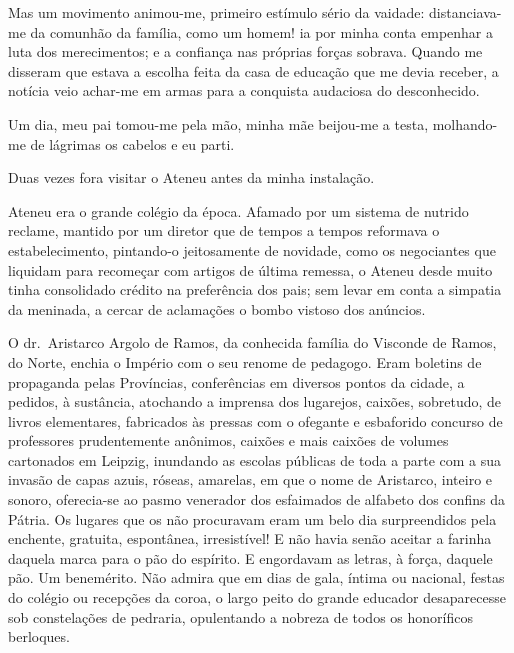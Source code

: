 Mas um movimento animou{}-me, primeiro estímulo sério da vaidade: 
distanciava{}-me da comunhão da família, como um homem! ia por minha conta 
empenhar a luta dos merecimentos; e a confiança nas próprias forças sobrava. 
Quando me disseram que estava a escolha feita da casa de educação que me devia
receber, a notícia veio achar{}-me em armas para a conquista audaciosa
do desconhecido. 

Um dia, meu pai tomou{}-me pela mão, minha mãe
beijou{}-me a testa, molhando{}-me de lágrimas os cabelos e eu parti.

Duas vezes fora visitar o Ateneu antes da minha instalação. 

Ateneu era o grande colégio da época. Afamado por um sistema de nutrido reclame,
mantido por um diretor que de tempos a tempos reformava o
estabelecimento, pintando{}-o jeitosamente de novidade, como os
negociantes que liquidam para recomeçar com artigos de última remessa,
o Ateneu desde muito tinha consolidado crédito na preferência dos pais;
sem levar em conta a simpatia da meninada, a cercar de aclamações o
bombo vistoso dos anúncios. 

O dr.~Aristarco Argolo de Ramos, da
conhecida família do Visconde de Ramos, do Norte, enchia o Império com
o seu renome de pedagogo. Eram boletins de propaganda pelas Províncias,
conferências em diversos pontos da cidade, a pedidos, à sustância,
atochando a imprensa dos lugarejos, caixões, sobretudo, de livros
elementares, fabricados às pressas com o ofegante e esbaforido concurso
de professores prudentemente anônimos, caixões e mais caixões de
volumes cartonados em Leipzig, inundando as escolas públicas de toda a
parte com a sua invasão de capas azuis, róseas, amarelas, em que o nome
de Aristarco, inteiro e sonoro, oferecia{}-se ao pasmo venerador dos
esfaimados de alfabeto dos confins da Pátria. Os lugares que os não
procuravam eram um belo dia surpreendidos pela enchente, gratuita,
espontânea, irresistível! E não havia senão aceitar a farinha daquela
marca para o pão do espírito. E engordavam as letras, à força, daquele
pão. Um benemérito. Não admira que em dias de gala, íntima ou nacional,
festas do colégio ou recepções da coroa, o largo peito do grande
educador desaparecesse sob constelações de pedraria, opulentando a
nobreza de todos os honoríficos berloques. 

